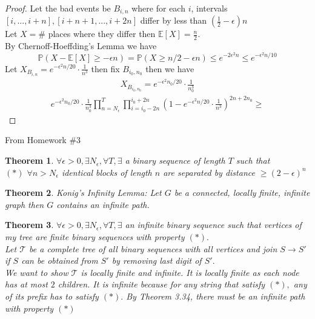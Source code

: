 \documentclass[a4paper]{article}
\newtheorem{thm}{Theorem}[section]
\begin{document}
\begin{proof}
    Let the bad events be $B_{i,n}$ where for each $i$, intervals $[i,...,i+n],[i+n+1,...,i+2n]$ differ by less than $\left (\frac{1}{2}-\epsilon \right )n$ \\
    Let $X=\#$ places where they differ then $\mathbb{E}[X]=\frac{n}{2}$.\\
    By Chernoff-Hoeffding's Lemma we have $$\mathbb{P}(X-\mathbb{E}[X]\geq -\epsilon n)=\mathbb{P}(X\geq n/2-\epsilon n)\leq e^{-2\epsilon^2 n}\leq e^{-\epsilon^2 n /10}$$
    Let $X_{B_{i,n}}=e^{-\epsilon^2 n /20}\cdot \frac{1}{n^3}$ then fix $B_{i_0, n_0}$ then we have 
    \begin{align*}
        X_{B_{i_0,n_0}}=e^{-\epsilon^2 n_0 /20}\cdot \frac{1}{n_0^3}
    \end{align*}
    \begin{align*}
        e^{-\epsilon^2 n_0 /20}\cdot \frac{1}{n_0^3}\prod_{n=N_\epsilon}^T\prod_{i=i_0-2n}^{i_0+2n}\left (1- e^{-\epsilon^2 n /20}\cdot \frac{1}{n^3}\right )^{2n+2n_0}\geq
    \end{align*}
\end{proof}
\noindent From Homework \#3
\begin{thm}
    $\forall \epsilon > 0, \exists N_\epsilon,  \forall T, \exists $ a binary sequence of length $T$ such that \\
    $(*)$ $\forall n> N_\epsilon$ identical blocks of length $n$ are separated by distance $\geq (2-\epsilon)^n$
\end{thm}
\begin{thm}
    Konig's Infinity Lemma: Let $G$ be a connected, locally finite, infinite graph then $G$ contains an infinite path.
\end{thm}
\begin{thm}
    $\forall \epsilon>0, \exists N_\epsilon, \forall T, \exists$ an infinite binary sequence such that vertices of my tree are finite binary sequences with property $(*).$\\
    Let $\mathcal{T}$ be a complete tree of all binary sequences with all vertices and join $S\to S'$ if $S$ can be obtained from $S'$ by removing last digit of $S'.$\\
    We want to show $\mathcal{T}$ is locally finite and infinite. It is locally finite as each node has at most $2$ children. It is infinite because for any string that satisfy $(*),$ any of its prefix has to satisfy $(*).$ By Theorem 3.34, there must be an infinite path with property $(*)$
\end{thm}
\end{document}

